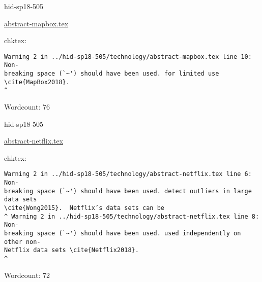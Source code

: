 

\begin{IU}

hid-sp18-505

\href{https://github.com/cloudmesh-community/hid-sp18-505/blob/master//technology/abstract-mapbox.tex}{abstract-mapbox.tex}

 
chktex:
\begin{tiny}
\begin{verbatim}
Warning 2 in ../hid-sp18-505/technology/abstract-mapbox.tex line 10: Non-
breaking space (`~') should have been used. for limited use \cite{MapBox2018}.
^
\end{verbatim}
\end{tiny}

Wordcount: 76

\end{IU}



\begin{IU}

hid-sp18-505

\href{https://github.com/cloudmesh-community/hid-sp18-505/blob/master//technology/abstract-netflix.tex}{abstract-netflix.tex}

 
chktex:
\begin{tiny}
\begin{verbatim}
Warning 2 in ../hid-sp18-505/technology/abstract-netflix.tex line 6: Non-
breaking space (`~') should have been used. detect outliers in large data sets
\cite{Wong2015}.  Netflix’s data sets can be
^ Warning 2 in ../hid-sp18-505/technology/abstract-netflix.tex line 8: Non-
breaking space (`~') should have been used. used independently on other non-
Netflix data sets \cite{Netflix2018}.
^
\end{verbatim}
\end{tiny}

Wordcount: 72

\end{IU}



